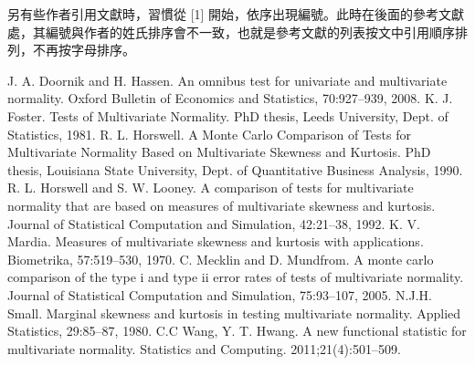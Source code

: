 \documentclass[12pt, a4paper]{article}
\begin{document}
另有些作者引用文獻時，習慣從 [1] 開始，依序出現編號。此時在後面的參考文獻處，其編號與作者的姓氏排序會不一致，也就是參考文獻的列表按文中引用順序排列，不再按字母排序。

\begin{thebibliography}{99} %
J. A. Doornik and H. Hassen. An omnibus test for univariate and multivariate normality.
Oxford Bulletin of Economics and Statistics, 70:927–939, 2008.
K. J. Foster. Tests of Multivariate Normality. PhD thesis, Leeds University, Dept.
of Statistics, 1981.
R. L. Horswell. A Monte Carlo Comparison of Tests for Multivariate Normality
Based on Multivariate Skewness and Kurtosis. PhD thesis, Louisiana State University,
Dept. of Quantitative Business Analysis, 1990.
R. L. Horswell and S. W. Looney. A comparison of tests for multivariate normality
that are based on measures of multivariate skewness and kurtosis. Journal of
Statistical Computation and Simulation, 42:21–38, 1992.
K. V. Mardia. Measures of multivariate skewness and kurtosis with applications.
Biometrika, 57:519–530, 1970.
C. Mecklin and D. Mundfrom. A monte carlo comparison of the type i and type ii
error rates of tests of multivariate normality. Journal of Statistical Computation and
Simulation, 75:93–107, 2005.
N.J.H. Small. Marginal skewness and kurtosis in testing multivariate normality.
Applied Statistics, 29:85–87, 1980.
C.C Wang, Y. T. Hwang. A new functional statistic for multivariate normality. Statistics
and Computing. 2011;21(4):501–509.
\end{thebibliography}
\end{document}
